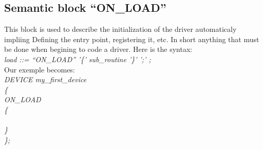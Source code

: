 \documentclass[a4paper,11pt]{report}
\begin{document}
    \subsection{Semantic block ``ON\_LOAD''}

This block is used to describe the initialization of the driver automaticaly
impliing Defining the entry point, registering it, etc. In short anything
that must be done when begining to code a driver. Here is the syntax:\\

     \emph{load ::= ``ON\_LOAD'' '\{' sub\_routine '\}' ';' ;}\\

Our exemple becomes:\\

\emph{DEVICE my\_first\_device\\\{\\ON\_LOAD\\\{\\\\\}\\\};\\}
\end{document}
